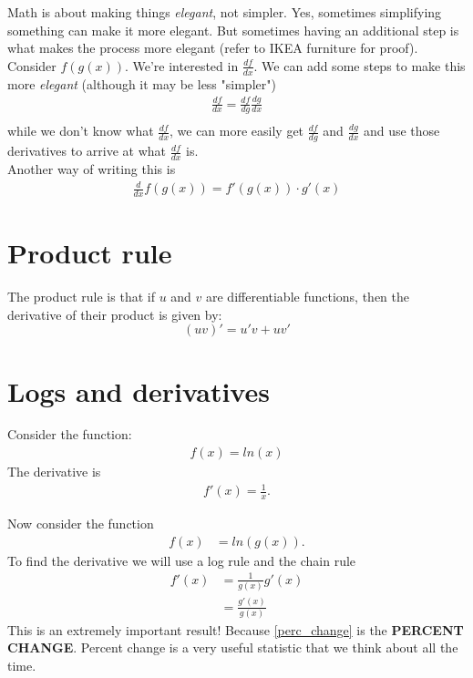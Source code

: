 \documentclass{article}
\begin{document}
Math is about making things \textit{elegant}, not simpler. Yes, sometimes simplifying something can make it more elegant. But sometimes having an additional step is what makes the process more elegant (refer to IKEA furniture for proof). \\

Consider $f(g(x))$. We're interested in $\frac{df}{dx}$. We can add some steps to make this more \textit{elegant} (although it may be less "simpler")
\begin{align}
    \frac{df}{dx}  = \frac{df}{dg}\frac{dg}{dx}  \\
\end{align}
while we don't know what $\frac{df}{dx}$, we can more easily get $\frac{df}{dg}$ and $\frac{dg}{dx}$ and use those derivatives to arrive at what $\frac{df}{dx}$ is. \\

Another way of writing this is 
\begin{align}
    \frac{d}{dx} f(g(x)) = f'(g(x)) \cdot g'(x)
\end{align}

\section{Product rule}
The product rule is that if $u$ and $v$ are differentiable functions, then the derivative of their product is given by:
\[
(uv)' = u'v + uv'
\]

\section{Logs and derivatives}
Consider the function: 
\begin{align}
    f(x) = ln(x)
\end{align}
The derivative is 
\begin{align}
    f'(x) = \frac{1}{x}.
\end{align}

Now consider the function 
\begin{align}
    f(x) &= ln(g(x)).
\end{align}
To find the derivative we will use a log rule and the chain rule 
\begin{align}
    f'(x) &= \frac{1}{g(x)} g'(x) \\
    &= \frac{g'(x)}{g(x)} \label{perc_change}
\end{align}
This is an extremely important result! Because \ref{perc_change}
is the \textbf{PERCENT CHANGE}. Percent change is a very useful statistic that we think about all the time. \\
\end{document}
